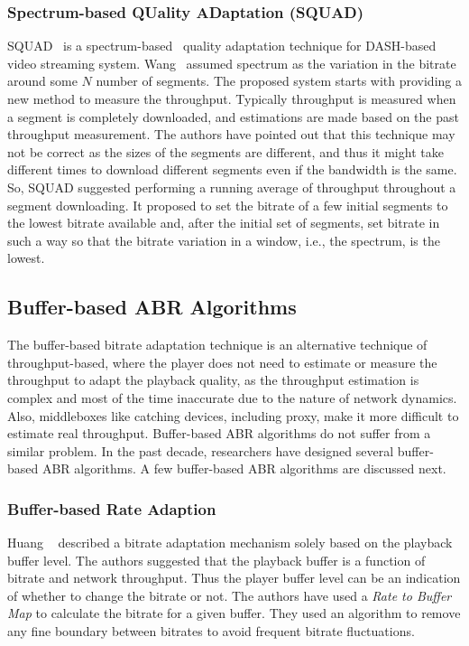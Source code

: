 \subsubsection{Spectrum-based QUality ADaptation (SQUAD)}
SQUAD~\cite{10.1145/2910017.2910593} is a spectrum-based~\cite{1386243} quality adaptation technique for DASH-based video streaming system. Wang \etal\ assumed spectrum as the variation in the bitrate around some $N$ number of segments. The proposed system starts with providing a new method to measure the throughput. Typically throughput is measured when a segment is completely downloaded, and estimations are made based on the past throughput measurement. The authors have pointed out that this technique may not be correct as the sizes of the segments are different, and thus it might take different times to download different segments even if the bandwidth is the same. So, SQUAD suggested performing a running average of throughput throughout a segment downloading. It proposed to set the bitrate of a few initial segments to the lowest bitrate available and, after the initial set of segments, set bitrate in such a way so that the bitrate variation in a window, i.e., the spectrum, is the lowest.


\subsection{Buffer-based ABR Algorithms}
The buffer-based bitrate adaptation technique is an alternative technique of throughput-based, where the player does not need to estimate or measure the throughput to adapt the playback quality, as the throughput estimation is complex and most of the time inaccurate due to the nature of network dynamics. Also, middleboxes like catching devices, including proxy, make it more difficult to estimate real throughput. Buffer-based ABR algorithms do not suffer from a similar problem. In the past decade, researchers have designed several buffer-based ABR algorithms. A few buffer-based ABR algorithms are discussed next. 

\subsubsection{Buffer-based Rate Adaption}
Huang \etal~\cite{Huang2014,10.1145/2398776.2398800,10.1145/2491172.2491179} described a bitrate adaptation mechanism solely based on the playback buffer level. The authors suggested that the playback buffer is a function of bitrate and network throughput. Thus the player buffer level can be an indication of whether to change the bitrate or not. The authors have used a \textit{Rate to Buffer Map} to calculate the bitrate for a given buffer. They used an algorithm to remove any fine boundary between bitrates to avoid frequent bitrate fluctuations.


